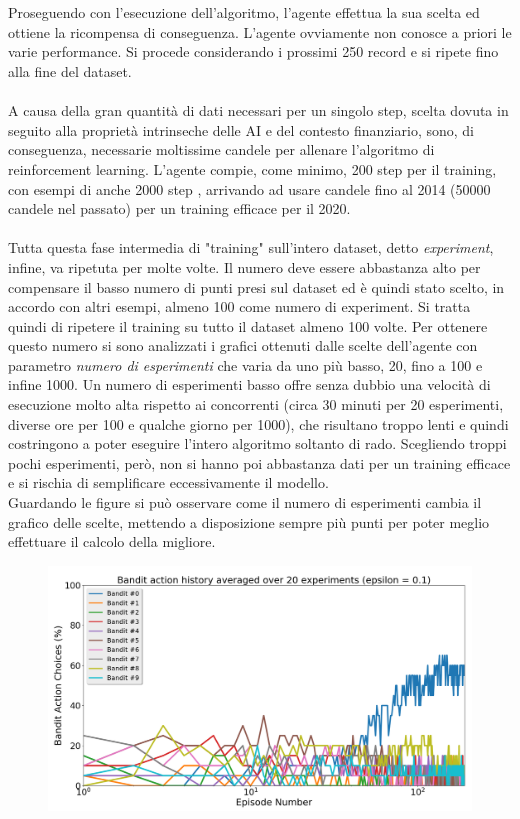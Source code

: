 \documentclass[a4paper,12pt]{report}
\begin{document}
\begin{fig}
\\~\\Proseguendo con l'esecuzione dell'algoritmo, l'agente effettua la sua scelta ed ottiene la ricompensa di conseguenza. L'agente ovviamente non conosce a priori le varie performance. Si procede considerando i prossimi 250 record e si ripete fino alla fine del dataset.\\~\\ A causa della gran quantità di dati necessari per un singolo step, scelta dovuta in seguito alla proprietà intrinseche delle AI e del contesto finanziario, sono, di conseguenza, necessarie moltissime candele per allenare l'algoritmo di reinforcement learning. L'agente compie, come minimo, 200 step per il training, con esempi di anche 2000 step \cite{46}, arrivando ad usare candele fino al 2014 (50000 candele nel passato) per un training efficace per il 2020.
\\~\\Tutta questa fase intermedia di "training" sull'intero dataset, detto \textit{experiment}, infine, va ripetuta per molte volte. Il numero deve essere abbastanza alto per compensare il basso numero di punti presi sul dataset ed è quindi stato scelto, in accordo con altri esempi, almeno 100 come numero di experiment. Si tratta quindi di ripetere il training su tutto il dataset almeno 100 volte. Per ottenere questo numero si sono analizzati i grafici ottenuti dalle scelte dell'agente con parametro \textit{numero di esperimenti} che varia da uno più basso, 20, fino a 100 e infine 1000. Un numero di esperimenti basso offre senza dubbio una velocità di esecuzione molto alta rispetto ai concorrenti (circa 30 minuti per 20 esperimenti, diverse ore per 100 e qualche giorno per 1000), che risultano troppo lenti e quindi costringono a poter eseguire l'intero algoritmo soltanto di rado. Scegliendo troppi pochi esperimenti, però, non si hanno poi abbastanza dati per un training efficace e si rischia di semplificare eccessivamente il modello.\\ Guardando le figure si può osservare come il numero di esperimenti cambia il grafico delle scelte, mettendo a disposizione sempre più punti per poter meglio effettuare il calcolo della migliore.
\begin{fig}
	\begin{center}
		\begin{subfigure}{\linewidth}
			\includegraphics[width=.5\linewidth]{bandit_choice_10}

\end{subfigure}
\end{center}
\end{fig}
\end{fig}
\end{document}
